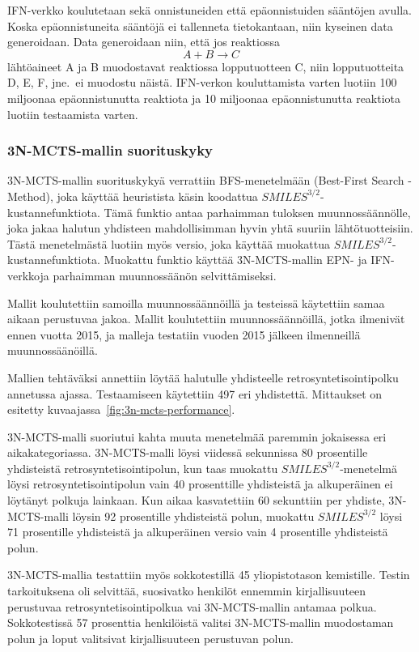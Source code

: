 \documentclass[finnish,twoside,censored,tkt,sw-line]{HYthesisML}
\begin{document}
IFN-verkko koulutetaan sekä onnistuneiden että epäonnistuiden sääntöjen avulla.
Koska epäonnistuneita sääntöjä ei tallenneta tietokantaan, niin kyseinen data generoidaan.
Data generoidaan niin, että jos reaktiossa \[A + B \rightarrow C\] lähtöaineet A ja B muodostavat reaktiossa lopputuotteen C, niin lopputuotteita D, E, F, jne.\ ei muodostu näistä.
IFN-verkon kouluttamista varten luotiin 100 miljoonaa epäonnistunutta reaktiota ja 10 miljoonaa epäonnistunutta reaktiota luotiin testaamista varten.

\subsubsection{3N-MCTS-mallin suorituskyky}

3N-MCTS-mallin suorituskykyä verrattiin BFS-menetelmään (Best-First Search -Method), joka käyttää heuristista käsin koodattua \(SMILES^{3/2}\)-kustannefunktiota.
Tämä funktio antaa parhaimman tuloksen muunnossäännölle, joka jakaa halutun yhdisteen mahdollisimman hyvin yhtä suuriin lähtötuotteisiin.
Tästä menetelmästä luotiin myös versio, joka käyttää muokattua \(SMILES^{3/2}\)-kustannefunktiota.
Muokattu funktio käyttää 3N-MCTS-mallin EPN- ja IFN-verkkoja parhaimman muunnossäänön selvittämiseksi.

Mallit koulutettiin samoilla muunnossäännöillä ja testeissä käytettiin samaa aikaan perustuvaa jakoa.
Mallit koulutettiin muunnossäännöillä, jotka ilmenivät ennen vuotta 2015, ja malleja testatiin vuoden 2015 jälkeen ilmenneillä muunnossäänöillä.

Mallien tehtäväksi annettiin löytää halutulle yhdisteelle retrosyntetisointipolku annetussa ajassa.
Testaamiseen käytettiin 497 eri yhdistettä.
Mittaukset on esitetty kuvaajassa~\ref{fig:3n-mcts-performance}.

3N-MCTS-malli suoriutui kahta muuta menetelmää paremmin jokaisessa eri aikakategoriassa.
3N-MCTS-malli löysi viidessä sekunnissa 80 prosentille yhdisteistä retrosyntetisointipolun, kun taas muokattu \(SMILES^{3/2}\)-menetelmä löysi retrosyntetisointipolun vain 40 prosenttille yhdisteistä ja alkuperäinen ei löytänyt polkuja lainkaan.
Kun aikaa kasvatettiin 60 sekunttiin per yhdiste, 3N-MCTS-malli löysin 92 prosentille yhdisteistä polun, muokattu \(SMILES^{3/2}\) löysi 71 prosentille yhdisteistä ja alkuperäinen versio vain 4 prosentille yhdisteistä polun.

3N-MCTS-mallia testattiin myös sokkotestillä 45 yliopistotason kemistille.
Testin tarkoituksena oli selvittää, suosivatko henkilöt ennemmin kirjallisuuteen perustuvaa retrosyntetisointipolkua vai 3N-MCTS-mallin antamaa polkua.
Sokkotestissä 57 prosenttia henkilöistä valitsi 3N-MCTS-mallin muodostaman polun ja loput valitsivat kirjallisuuteen perustuvan polun.
\end{document}
